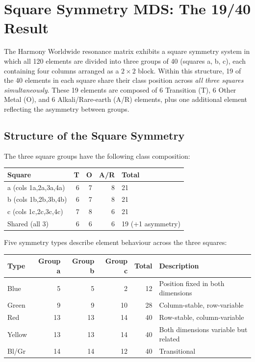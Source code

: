 \documentclass[preprint]{iacrtrans}
\begin{document}
\section{Square Symmetry MDS: The 19/40 Result}
\label{sec:symmetry}

The Harmony Worldwide resonance matrix exhibits a square symmetry system in
which all 120 elements are divided into three groups of 40 (squares a, b, c),
each containing four columns arranged as a $2 \times 2$ block. Within this
structure, 19 of the 40 elements in each square share their class position
across \emph{all three squares simultaneously}. These 19 elements are composed
of 6 Transition (T), 6 Other Metal (O), and 6 Alkali/Rare-earth (A/R)
elements, plus one additional element reflecting the asymmetry between groups.

\subsection{Structure of the Square Symmetry}

The three square groups have the following class composition:

\begin{center}
\begin{tabular}{lrrrl}
\toprule
Square & T & O & A/R & Total \\
\midrule
a (cols 1a,2a,3a,4a) & 6 & 7 & 8 & 21 \\
b (cols 1b,2b,3b,4b) & 6 & 7 & 8 & 21 \\
c (cols 1c,2c,3c,4c) & 7 & 8 & 6 & 21 \\
\midrule
Shared (all 3)       & 6 & 6 & 6 & 19 (+1 asymmetry) \\
\bottomrule
\end{tabular}
\end{center}

Five symmetry types describe element behaviour across the three squares:

\begin{center}
\begin{tabular}{lrrrrl}
\toprule
Type & Group a & Group b & Group c & Total & Description \\
\midrule
Blue   & 5  & 5  & 2  & 12 & Position fixed in both dimensions \\
Green  & 9  & 9  & 10 & 28 & Column-stable, row-variable \\
Red    & 13 & 13 & 14 & 40 & Row-stable, column-variable \\
Yellow & 13 & 13 & 14 & 40 & Both dimensions variable but related \\
Bl/Gr  & 14 & 14 & 12 & 40 & Transitional \\
\bottomrule
\end{tabular}
\end{center}
\end{document}
